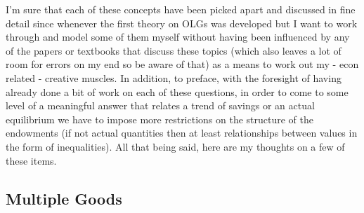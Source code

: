 \documentclass[11pt,english]{article}
\begin{document}
\noindent I'm sure that each of these concepts have been picked apart and discussed in fine detail since whenever the first theory on OLGs was developed but I want to work through and model some of them myself without having been influenced by any of the papers or textbooks that discuss these topics (which also leaves a lot of room for errors on my end so be aware of that) as a means to work out my - econ related - creative muscles. In addition, to preface, with the foresight of having already done a bit of work on each of these questions, in order to come to some level of a meaningful answer that relates a trend of savings or an actual equilibrium we have to impose more restrictions on the structure of the endowments (if not actual quantities then at least relationships between values in the form of inequalities). All that being said, here are my thoughts on a few of these items.

\subsection*{Multiple Goods}
\end{document}
